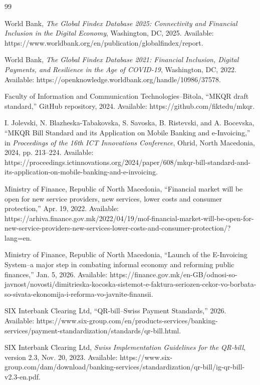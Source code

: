 \begin{thebibliography}{99}

World Bank, \textit{The Global Findex Database 2025: Connectivity and Financial Inclusion in the Digital Economy}, Washington, DC, 2025. Available: https://www.worldbank.org/en/publication/globalfindex/report.

World Bank, \textit{The Global Findex Database 2021: Financial Inclusion, Digital Payments, and Resilience in the Age of COVID-19}, Washington, DC, 2022. Available: https://openknowledge.worldbank.org/handle/10986/37578.

Faculty of Information and Communication Technologies--Bitola, ``MKQR draft standard,'' GitHub repository, 2024. Available: https://github.com/fiktedu/mkqr.

I. Jolevski, N. Blazheska-Tabakovska, S. Savoska, B. Ristevski, and A. Bocevska, ``MKQR Bill Standard and its Application on Mobile Banking and e-Invoicing,'' in \textit{Proceedings of the 16th ICT Innovations Conference}, Ohrid, North Macedonia, 2024, pp. 213--224. Available: https://proceedings.ictinnovations.org/2024/paper/608/mkqr-bill-standard-and-its-application-on-mobile-banking-and-e-invoicing.

Ministry of Finance, Republic of North Macedonia, ``Financial market will be open for new service providers, new services, lower costs and consumer protection,'' Apr. 19, 2022. Available: https://arhiva.finance.gov.mk/2022/04/19/mof-financial-market-will-be-open-for-new-service-providers-new-services-lower-costs-and-consumer-protection/?lang=en.

Ministry of Finance, Republic of North Macedonia, ``Launch of the E-Invoicing System--a major step in combating informal economy and reforming public finances,'' Jan. 5, 2026. Available: https://finance.gov.mk/en-GB/odnosi-so-javnost/novosti/dimitrieska-kocoska-sistemot-e-faktura-seriozen-cekor-vo-borbata-so-sivata-ekonomija-i-reforma-vo-javnite-finansii.

SIX Interbank Clearing Ltd, ``QR-bill--Swiss Payment Standards,'' 2026. Available: https://www.six-group.com/en/products-services/banking-services/payment-standardization/standards/qr-bill.html.

SIX Interbank Clearing Ltd, \textit{Swiss Implementation Guidelines for the QR-bill}, version 2.3, Nov. 20, 2023. Available: https://www.six-group.com/dam/download/banking-services/standardization/qr-bill/ig-qr-bill-v2.3-en.pdf.


\end{thebibliography}
